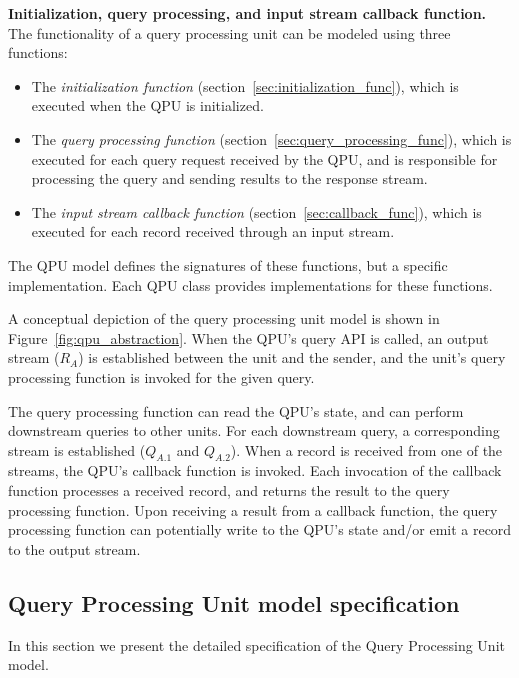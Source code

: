 \medskip
\noindent
\textbf{Initialization, query processing, and input stream callback function.}
The functionality of a query processing unit can be modeled using three functions:
\begin{itemize}
  \item The \textit{initialization function} (section~\ref{sec:initialization_func}), which is executed when the QPU is
  initialized.

  \item The \textit{query processing function} (section~\ref{sec:query_processing_func}), which is executed for each
  query request received by the QPU, and is responsible for processing the query and sending results to the response stream.

  \item The \textit{input stream callback function} (section~\ref{sec:callback_func}), which is executed for each record
  received through an input stream.

\end{itemize}

The QPU model defines the signatures of these functions, but a specific implementation.
Each QPU class provides implementations for these functions.

\bigskip

A conceptual depiction of the query processing unit model is shown in Figure~\ref{fig:qpu_abstraction}.
When the QPU's query API is called, an output stream ($R_A$) is established between the unit and the sender,
and the unit's query processing function is invoked for the given query.

The query processing function can read the QPU's state, and can perform downstream queries to other units.
For each downstream query, a corresponding stream is established ($Q_{A.1}$ and $Q_{A.2}$).
When a record is received from one of the streams, the QPU's callback function is invoked.
Each invocation of the callback function processes a received record, and returns the result to the query processing
function.
Upon receiving a result from a callback function,
the query processing function can potentially write to the QPU's state and/or emit a record to the output stream.


\subsection{Query Processing Unit model specification}
\label{ref:specification}

In this section we present the detailed specification of the Query Processing Unit model.

